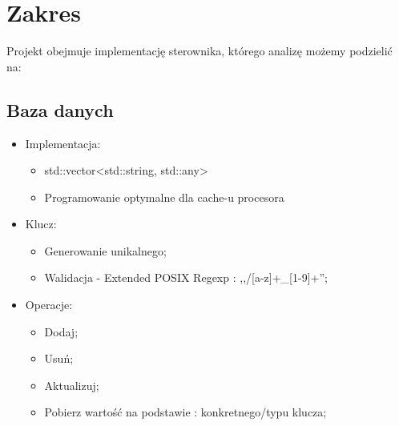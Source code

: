\section{Zakres}
	Projekt obejmuje implementację sterownika, którego analizę możemy podzielić na:

	\subsection{Baza danych}
	\begin{itemize}
		\item Implementacja:
		\begin{itemize}
			\item std::vector<std::string, std::any>
			\item Programowanie optymalne dla cache-u procesora
		\end{itemize}
		\item Klucz:
		\begin{itemize}
			\item Generowanie unikalnego;
			\item Walidacja - Extended POSIX Regexp : ,,/[a-z]+\_[1-9]+'';
		\end{itemize}
		\item Operacje:
		\begin{itemize}
			\item Dodaj;
			\item Usuń;
			\item Aktualizuj;
			\item Pobierz wartość na podstawie : konkretnego/typu klucza;
		\end{itemize}
	\end{itemize}

